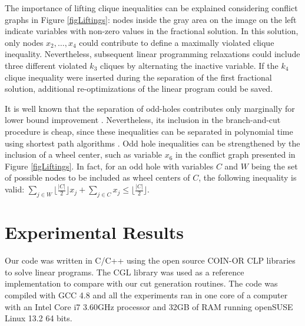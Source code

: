 \documentclass{endm}
\begin{document}
The importance of lifting clique inequalities can be explained considering conflict graphs in Figure \ref{figLiftings}: nodes inside the gray area on the image on the left indicate variables with non-zero values in the fractional solution. In this solution, only nodes $x_{2},\ldots,x_{4}$ could contribute to define a maximally violated clique inequality. Nevertheless, subsequent linear programming relaxations could include three different violated $k_{3}$ cliques by alternating the inactive variable. If the $k_{4}$ clique inequality were inserted during the separation of the first fractional solution, additional re-optimizations of the linear program could be saved. 

It is well known that the separation of odd-holes contributes only marginally for lower bound improvement \cite{Borndorfer1998,Mendez-Diaz2008}. Nevertheless, its inclusion in the branch-and-cut procedure is cheap, since these inequalities can be separated in polynomial time using shortest path algorithms \cite{Grotschel1993}. Odd hole inequalities can be strengthened by the inclusion of a wheel center, such as variable $x_{6}$ in the conflict graph presented in Figure \ref{figLiftings}. In fact, for an odd hole with variables $C$ and $W$ being the set of possible nodes to be included as wheel centers of $C$, the following inequality is valid: $\displaystyle \sum_{j \in W} \lfloor \frac{|C|}{2} \rfloor x_{j} + \sum_{j \in C} x_{j} \leq \lfloor \frac{|C|}{2} \rfloor$.

\begin{figure}
\begin{center}
\label{figOH}
\end{center}
\end{figure}


\section{Experimental Results}\label{experiments}

Our code was written in C/C++ using the open source COIN-OR CLP libraries to solve linear programs. The CGL library was used as a reference implementation to compare with our cut generation routines. The code was compiled with GCC 4.8 and all the experiments ran in one core of a computer with an Intel Core i7 3.60GHz processor and 32GB of RAM running openSUSE Linux 13.2 64 bits.
\end{document}
